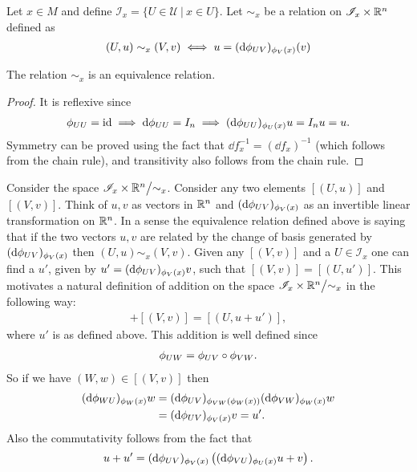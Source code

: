 \begin{definition}
  Let $x\in M$ and define $ \mathscr{I}_x = \{U\in \mathscr{U}\ |\ x\in U\}$. Let $\sim_x$ be a relation on $ \mathscr{I}_x\times \mathbb{R}^n$ defined as
  \begin{align*}
    (U, u) \sim_x (V,v) \iff u = (\dd \phi_{UV})_{\phi_V(x)} (v)
  \end{align*}
\end{definition}
\begin{proposition}
  The relation $\sim_x$ is an equivalence relation.
\end{proposition}
\begin{proof}
  It is reflexive since
  \begin{align*}
    \phi_{UU} = \text{id} \implies \dd \phi_{UU} = I_{n} \implies (\dd \phi_{UU})_{\phi_U(x)} u = I_n u = u.
  \end{align*}
  Symmetry can be proved using the fact that $\dd f^{-1}_x = (\dd f_x)^{-1}$ (which follows from the chain rule), and transitivity also follows from the chain rule.
\end{proof}
Consider the space $ \mathscr{I}_x \times \R^n\bign/\sim_x$. Consider any two elements $[(U,u)]$ and $[(V,v)]$. Think of $u,v$ as vectors in $\mathbb{R}^n$ and $(\dd \phi_{UV})_{\phi_V(x)}$ as an invertible linear transformation on $\mathbb{R}^n$. In a sense the equivalence relation defined above is saying that if the two vectors $u,v$ are related by the change of basis generated by $(\dd \phi_{UV})_{\phi_V(x)}$ then $(U,u)\sim_x (V,v)$. Given any $[(V,v)]$ and a $U \in \mathscr{I}_x$ one can find a $u'$, given by $u' = (\dd \phi_{UV})_{\phi_V(x)} v$, such that $[(V,v)] = [(U,u')]$. This motivates a natural definition of addition on the space $ \mathscr{I}_x\times \R^n \bign/\sim_x$ in the following way:
\begin{align*}
  [(U,u)] + [(V,v)] = [(U, u+ u')],
\end{align*}
where $u'$ is as defined above. This addition is well defined since
\begin{align*}
  \phi_{UW} = \phi_{UV} \circ \phi_{VW}.
\end{align*}
So if we have $(W,w) \in [(V,v)]$ then
\begin{align*}
  (\dd \phi_{WU})_{\phi_W(x)} w &= (\dd \phi_{UV})_{\phi_{VW}(\phi_W(x))} (\dd \phi_{VW})_{\phi_W(x)}w\\
                          &= (\dd \phi_{UV})_{\phi_V(x)}v = u'.
\end{align*}
Also the commutativity follows from the fact that
\begin{align*}
  u+u' = (\dd \phi_{UV})_{\phi_V(x)} \left( (\dd \phi_{VU})_{\phi_U(x)}u + v\right).
\end{align*}
